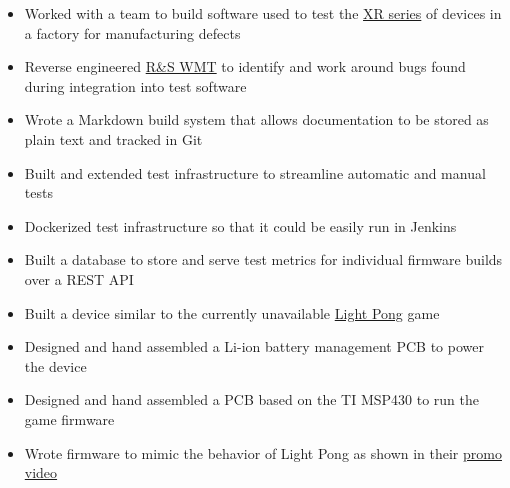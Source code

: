 \documentclass{resume}
\begin{document}
\begin{itemize}
    \item Worked with a team to build software used to test the \href{https://source.sierrawireless.com/devices/xr-series/xr90/}{XR series} of devices in a factory for manufacturing defects
    \item Reverse engineered \href{https://www.rohde-schwarz.com/us/products/test-and-measurement/wireless-communications-testers-systems/wireless-communication-testers-systems/wireless-manufacturing-test_253261.html}{R\&S WMT} to identify and work around bugs found during integration into test software
    \item Wrote a Markdown build system that allows documentation to be stored as plain text and tracked in Git
\end{itemize}

\begin{itemize}
    \item Built and extended test infrastructure to streamline automatic and manual tests
    \item Dockerized test infrastructure so that it could be easily run in Jenkins
    \item Built a database to store and serve test metrics for individual firmware builds over a REST API
\end{itemize}

\TechnicalProjects

\begin{itemize}
    \item Built a device similar to the currently unavailable \href{https://www.playlightpong.com/}{Light Pong} game
    \item Designed and hand assembled a Li-ion battery management PCB to power the device
    \item Designed and hand assembled a PCB based on the TI MSP430 to run the game firmware
    \item Wrote firmware to mimic the behavior of Light Pong as shown in their \href{https://player.vimeo.com/video/616594964}{promo video}
\end{itemize}
\end{document}
